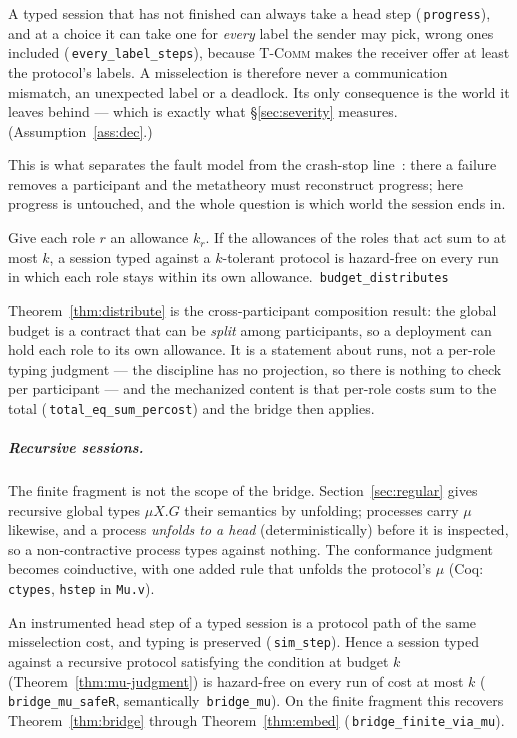 \documentclass[a4paper,UKenglish,cleveref,autoref,thm-restate,anonymous]{lipics-v2021}
\newcommand{\coqok}[1]{\textcolor{okgreen}{\ding{51}}\,\texttt{\small #1}}
\begin{document}
\begin{theorem}\label{thm:progress}
A typed session that has not finished can always take a head step
(\coqok{progress}), and at a choice it can take one for \emph{every} label the
sender may pick, wrong ones included (\coqok{every\_label\_steps}), because
\textsc{T-Comm} makes the receiver offer at least the protocol's labels. A
misselection is therefore never a communication mismatch, an unexpected label
or a deadlock. Its only consequence is the world it leaves behind --- which is
exactly what \S\ref{sec:severity} measures. (Assumption~\ref{ass:dec}.)
\end{theorem}

This is what separates the fault model from the crash-stop
line~\cite{barwell-concur22,barwell-ecoop23}: there a failure removes a
participant and the metatheory must reconstruct progress; here progress is
untouched, and the whole question is which world the session ends in.

\begin{theorem}\label{thm:distribute}
Give each role $r$ an allowance $k_r$. If the allowances of the roles that act
sum to at most $k$, a session typed against a $k$-tolerant protocol is
hazard-free on every run in which each role stays within its own allowance.
\coqok{budget\_distributes}
\end{theorem}

Theorem~\ref{thm:distribute} is the cross-participant composition result: the
global budget is a contract that can be \emph{split} among participants, so a
deployment can hold each role to its own allowance. It is a statement about
runs, not a per-role typing judgment --- the discipline has no projection, so
there is nothing to check per participant --- and the mechanized content is
that per-role costs sum to the total (\coqok{total\_eq\_sum\_percost}) and
the bridge then applies.

\subparagraph*{Recursive sessions.} The finite fragment is not the scope of the
bridge. Section~\ref{sec:regular} gives recursive global types $\mu X.G$ their
semantics by unfolding; processes carry $\mu$ likewise, and a process
\emph{unfolds to a head} (deterministically) before it is inspected, so a
non-contractive process types against nothing. The conformance judgment
becomes coinductive, with one added rule that unfolds the protocol's $\mu$
(Coq: \texttt{ctypes}, \texttt{hstep} in \texttt{Mu.v}).

\begin{theorem}\label{thm:bridge-mu}
An instrumented head step of a typed session is a protocol path of the same
misselection cost, and typing is preserved (\coqok{sim\_step}). Hence a
session typed against a recursive protocol satisfying the condition at budget
$k$ (Theorem~\ref{thm:mu-judgment}) is hazard-free on every run of cost at
most $k$ (\coqok{bridge\_mu\_safeR}, semantically \coqok{bridge\_mu}). On the
finite fragment this recovers Theorem~\ref{thm:bridge} through
Theorem~\ref{thm:embed} (\coqok{bridge\_finite\_via\_mu}).
\end{theorem}
\end{document}
